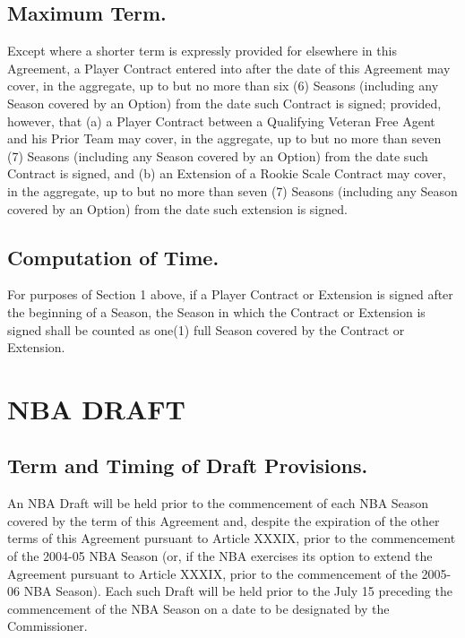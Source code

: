 \documentclass[
]{book}
\begin{document}
\hypertarget{maximum-term.}{%
\section{Maximum Term.}\label{maximum-term.}}

Except where a shorter term is expressly provided for elsewhere in this Agreement, a Player Contract entered into after the date of this Agreement may cover, in the aggregate, up to but no more than six (6) Seasons (including any Season covered by an Option) from the date such Contract is signed; provided, however, that (a) a Player Contract between a Qualifying Veteran Free Agent and his Prior Team may cover, in the aggregate, up to but no more than seven (7) Seasons (including any Season covered by an Option) from the date such Contract is signed, and (b) an Extension of a Rookie Scale Contract may cover, in the aggregate, up to but no more than seven (7) Seasons (including any Season covered by an Option) from the date such extension is signed.

\hypertarget{computation-of-time.}{%
\section{Computation of Time.}\label{computation-of-time.}}

For purposes of Section 1 above, if a Player Contract or Extension is signed after the beginning of a Season, the Season in which the Contract or Extension is signed shall be counted as one(1) full Season covered by the Contract or Extension.

\hypertarget{nba-draft}{%
\chapter{NBA DRAFT}\label{nba-draft}}

\hypertarget{term-and-timing-of-draft-provisions.}{%
\section{Term and Timing of Draft Provisions.}\label{term-and-timing-of-draft-provisions.}}

An NBA Draft will be held prior to the commencement of each NBA Season covered by the term of this Agreement and, despite the expiration of the other terms of this Agreement pursuant to Article XXXIX, prior to the commencement of the 2004-05 NBA Season (or, if the NBA exercises its option to extend the Agreement pursuant to Article XXXIX, prior to the commencement of the 2005-06 NBA Season). Each such Draft will be held prior to the July 15 preceding the commencement of the NBA Season on a date to be designated by the Commissioner.
\end{document}
